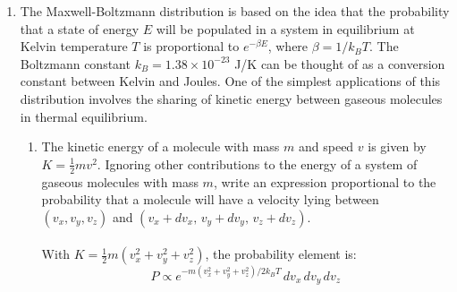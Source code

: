 \documentclass{article}
\begin{document}
\begin{enumerate}
\begin{enumerate}
            \item Determine the average height of a gas molecule of mass $m$ in equilibrium at Kelvin temperature $T$. Find the average height of a chlorine, argon, and oxygen molecule/atom in thermal equilibrium at 300 Kelvin, in kilometers, then determine the probability that each of these will be found above 20 kilometers.
            \\
            \\The mean height is:
            \[\langle h\rangle = \int_0^\infty h\,p(h)\,dh = \frac{k_BT}{mg} = \frac{RT}{Mg}\]
            where $M = mN_A$ is the molar mass and $R = k_B N_A$. With $RT/g = (8.314)(300)/9.8 = 254.5$ m$\cdot$kg/mol:
            \[\langle h\rangle_{\text{Cl}_2} = \frac{254.5}{0.0709} \approx \boxed{3.59\text{ km}}, \quad
              \langle h\rangle_{\text{Ar}}  = \frac{254.5}{0.03995} \approx \boxed{6.37\text{ km}}, \quad
              \langle h\rangle_{\text{O}_2} = \frac{254.5}{0.032}  \approx \boxed{7.95\text{ km}}\]
            The probability of finding a molecule above height $h_0$ is $P(h>h_0) = e^{-h_0/\langle h\rangle}$:
            \[P_{\text{Cl}_2}(h>20\text{ km}) = e^{-20/3.59} \approx \boxed{0.38\%}, \quad
              P_{\text{Ar}}(h>20\text{ km})  = e^{-20/6.37} \approx \boxed{4.33\%},\]\[
              P_{\text{O}_2}(h>20\text{ km}) = e^{-20/7.95} \approx \boxed{8.09\%}\]
        \end{enumerate}

        \item The Maxwell-Boltzmann distribution is based on the idea that the probability that a state of energy $E$ will be populated in a system in equilibrium at Kelvin temperature $T$ is proportional to $e^{-\beta E}$, where $\beta = 1/k_BT$. The Boltzmann constant $k_B = 1.38\times10^{-23}$ J/K can be thought of as a conversion constant between Kelvin and Joules. One of the simplest applications of this distribution involves the sharing of kinetic energy between gaseous molecules in thermal equilibrium.

        \begin{enumerate}
            \item The kinetic energy of a molecule with mass $m$ and speed $v$ is given by $K = \frac{1}{2}mv^2$. Ignoring other contributions to the energy of a system of gaseous molecules with mass $m$, write an expression proportional to the probability that a molecule will have a velocity lying between $(v_x, v_y, v_z)$ and $(v_x+dv_x,\, v_y+dv_y,\, v_z+dv_z)$.
            \\
            \\With $K = \frac{1}{2}m(v_x^2+v_y^2+v_z^2)$, the probability element is:
            \[\boxed{P \propto e^{-m(v_x^2+v_y^2+v_z^2)/2k_BT}\,dv_x\,dv_y\,dv_z}\]


\end{enumerate}
\end{enumerate}
\end{document}
